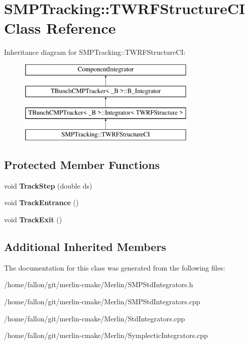 \hypertarget{classSMPTracking_1_1TWRFStructureCI}{}\section{S\+M\+P\+Tracking\+:\+:T\+W\+R\+F\+Structure\+CI Class Reference}
\label{classSMPTracking_1_1TWRFStructureCI}
Inheritance diagram for S\+M\+P\+Tracking\+:\+:T\+W\+R\+F\+Structure\+CI\+:\begin{figure}[H]
\begin{center}
\leavevmode
\includegraphics[height=4.000000cm]{classSMPTracking_1_1TWRFStructureCI}
\end{center}
\end{figure}
\subsection*{Protected Member Functions}
\begin{DoxyCompactItemize}
\item 
\mbox{\label{classSMPTracking_1_1TWRFStructureCI_a6f39520aa32783b5f2732201ab3eea2a}} 
void {\bfseries Track\+Step} (double ds)
\item 
\mbox{\label{classSMPTracking_1_1TWRFStructureCI_aa8b88fb9709b7897de614cfd69ea1961}} 
void {\bfseries Track\+Entrance} ()
\item 
\mbox{\label{classSMPTracking_1_1TWRFStructureCI_a905aeab1943841e2af4255f70922a078}} 
void {\bfseries Track\+Exit} ()
\end{DoxyCompactItemize}
\subsection*{Additional Inherited Members}


The documentation for this class was generated from the following files\+:\begin{DoxyCompactItemize}
\item 
/home/fallon/git/merlin-\/cmake/\+Merlin/S\+M\+P\+Std\+Integrators.\+h\item 
/home/fallon/git/merlin-\/cmake/\+Merlin/S\+M\+P\+Std\+Integrators.\+cpp\item 
/home/fallon/git/merlin-\/cmake/\+Merlin/Std\+Integrators.\+cpp\item 
/home/fallon/git/merlin-\/cmake/\+Merlin/Symplectic\+Integrators.\+cpp\end{DoxyCompactItemize}
